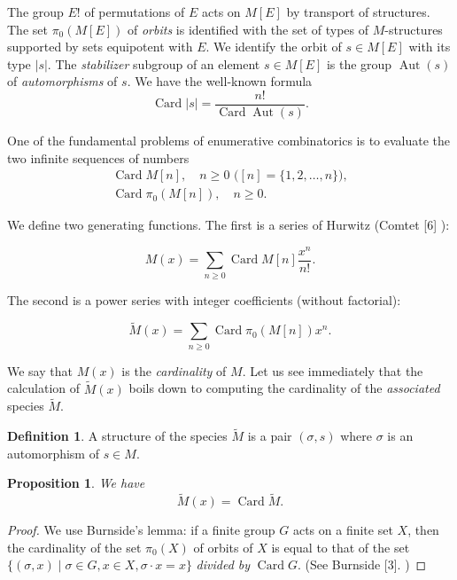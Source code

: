 \documentclass{article}
\newtheorem{prop}[thm]{Proposition}
\theoremstyle{definition}
\newtheorem{defn}[thm]{Definition}
\theoremstyle{remark}
\DeclareMathOperator{\Card}{Card}
\DeclareMathOperator{\Aut}{Aut}
\newcommand{\unl}[1]{\tilde{#1}}
\begin{document}
\subsubsection{}
The group $E!$ of permutations of $E$ acts on $M [E]$ by transport
of structures. The set $\pi_0 (M [E])$ of \emph{orbits} is identified
with the set of types of $M$-structures supported by sets equipotent
with $E$. We identify the orbit of $s \in M[E]$ with its type
$|s|$. The \emph{stabilizer} subgroup of an element $s \in M [E]$ is
the group $\Aut (s)$ of \emph{automorphisms} of $s$. We have the
well-known formula \[ \Card |s| = \frac{n!}{\Card \Aut(s)}. \]

One of the fundamental problems of enumerative combinatorics is to
evaluate the two infinite sequences of numbers
\begin{gather}
  \Card M[n], \quad \text{$n \geq 0$ ($[n] = \{1, 2, \dots, n\}$)}, \\
  \Card \pi_0(M[n]), \quad n \geq 0.
\end{gather}

We define two generating functions. The first is a series of Hurwitz
(Comtet [6] ):

\begin{equation}
  M(x) = \sum_{n \geq 0} \Card M[n] \frac{x^n}{n!}.
\end{equation}

The second is a power series with integer coefficients (without
factorial):

\begin{equation}
  \unl M(x) = \sum_{n \geq 0} \Card \pi_0(M[n]) x^n.
\end{equation}

We say that $M (x)$ is the \emph{cardinality} of $M$. Let us see
immediately that the calculation of $\unl M (x)$ boils down to
computing the cardinality of the \emph{associated} species $\unl M$.

\begin{defn}
  A structure of the species $\unl M$ is a pair $(\sigma, s)$ where
  $\sigma$ is an automorphism of $s \in M$.
\end{defn}

\begin{prop}
  We have
  \[ \unl M (x) = \Card {\unl M}. \]
\end{prop}

\begin{proof}
  We use Burnside's lemma: if a finite group $G$ acts on a finite set
  $X$, then the cardinality of the set $\pi_0(X)$ of orbits of $X$ is
  equal to that of the set $\{(\sigma, x) \mid \sigma \in G, x \in X,
  \sigma \cdot x = x\}$ \emph{divided by} $\Card G$. (See Burnside
  [3]. )
\end{proof}
\end{document}
